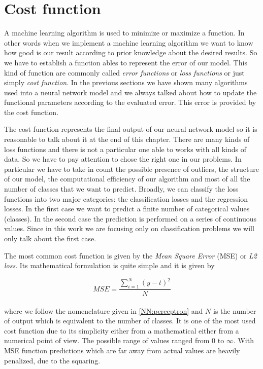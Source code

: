 \documentclass{standalone}
\begin{document}
\section[Cost function]{Cost function}\label{NN:cost}

A machine learning algorithm is used to minimize or maximize a function.
In other words when we implement a machine learning algorithm we want to know how good is our result according to prior knowledge about the desired results.
So we have to establish a function ables to represent the error of our model.
This kind of function are commonly called \emph{error functions} or \emph{loss functions} or just simply \emph{cost function}.
In the previous sections we have shown many algorithms used into a neural network model and we always talked about how to update the functional parameters according to the evaluated error.
This error is provided by the cost function.

The cost function represents the final output of our neural network model so it is reasonable to talk about it at the end of this chapter.
There are many kinds of loss functions and there is not a particular one able to works with all kinds of data.
So we have to pay attention to chose the right one in our problems.
In particular we have to take in count the possible presence of outliers, the structure of our model, the computational efficiency of our algorithm and most of all the number of classes that we want to predict.
Broadly, we can classify the loss functions into two major categories: the classification losses and the regression losses.
In the first case we want to predict a finite number of categorical values (classes).
In the second case the prediction is performed on a series of continuous values.
Since in this work we are focusing only on classification problems we will only talk about the first case.

The most common cost function is given by the \emph{Mean Square Error} (MSE) or \emph{L2 loss}.
Its mathematical formulation is quite simple and it is given by

$$
MSE = \frac{\sum_{i=1}^{N}\left( y - t \right)^2}{N}
$$
\\
where we follow the nomenclature given in \ref{NN:perceptron} and $N$ is the number of output which is equivalent to the number of classes.
It is one of the most used cost function due to its simplicity either from a mathematical either from a numerical point of view.
The possible range of values ranged from 0 to $\infty$.
With MSE function predictions which are far away from actual values are heavily penalized, due to the squaring.
\end{document}
